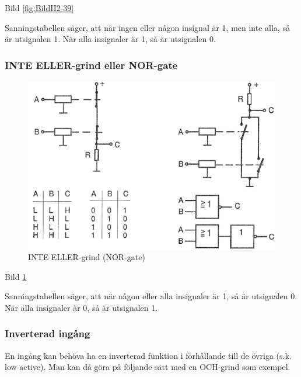 Bild \ref{fig:BildII2-39}

Sanningstabellen säger, att när ingen eller någon insignal är 1, men inte alla,
så är utsignalen 1. När alla insignaler är 1, så är utsignalen 0.

\subsubsection{INTE ELLER-grind eller NOR-gate}

\begin{figure}
\includegraphics[width=\textwidth]{images/cropped_pdfs/bild_2_2-40.pdf}
\caption{INTE ELLER-grind (NOR-gate)}
\label{fig:BildII2-40}
\end{figure}

Bild \ref{fig:BildII2-40}

Sanningstabellen säger, att när någon eller alla insignaler är 1, så är
utsignalen 0. När alla insignaler är 0, så är utsignalen 1.

\subsubsection{Inverterad ingång}

En ingång kan behöva ha en inverterad funktion i förhållande till de övriga
(s.k. low active). Man kan då göra på följande sätt med en OCH-grind som
exempel.

